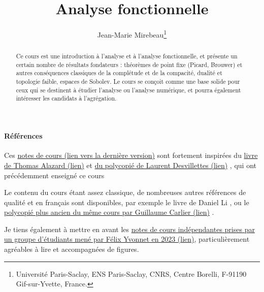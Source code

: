 \documentclass[11pt]{article}
\title{Analyse fonctionnelle}
\author{Jean-Marie Mirebeau\footnote{
Universit\'e Paris-Saclay, ENS Paris-Saclay, CNRS, Centre Borelli, F-91190 Gif-sur-Yvette, France.
}}
\begin{document}
\maketitle
\begin{abstract}
Ce cours est une introduction à l'analyse et à l'analyse fonctionnelle, et présente un certain nombre de résultats fondateurs : théorèmes de point fixe (Picard, Brouwer) et autres conséquences classiques de la complétude et de la compacité, dualité et topologie faible, espaces de Sobolev.
Le cours se conçoit comme une base solide pour ceux qui se destinent à étudier l'analyse ou l'analyse numérique, et pourra également intéresser les candidats à l'agrégation. 
\end{abstract}


\tableofcontents

\paragraph{Références}

Ces \href{https://www.dropbox.com/scl/fi/d3vfdgnaje0iwxyfyejqw/M1_Analyse_Shared.pdf?rlkey=qfngap7sa3uh1xo5ukxt8ddpi&dl=0}{notes de cours (lien vers la dernière version)} sont fortement inspirées du 
\href{http://talazard.perso.math.cnrs.fr/Livre.pdf}{livre de Thomas Alazard (lien)} 
\cite{alazard2017analyse} et 
\href{https://www.dropbox.com/scl/fi/t7tj1pm7pxcc5t67gyizj/Desvillettes_2015_AF.pdf?rlkey=8k1gvfgcmiczqqjxxvwblnugn&dl=1}{du polycopié de Laurent Desvillettes (lien)} 
\cite{desvilettes2015analyse}, qui ont précédemment enseigné ce cours

Le contenu du cours étant assez classique, de nombreuses autres références de qualité et en français sont disponibles, par exemple le livre de Daniel Li \cite{li2013cours}, ou le 
\href{https://www.ceremade.dauphine.fr/~carlier/poly2010.pdf}{polycopié plus ancien du même cours par Guillaume Carlier (lien)} \cite{carlier2009analyse}.

Je tiens également à mettre en avant les 
\href{https://www.dropbox.com/scl/fi/3gir3uhkt842idl9sfyc3/main_Shared.pdf?rlkey=xruzgtc6kzfedhjx0uecku0yq&dl=0}{notes de cours indépendantes prises par un groupe d'étudiants mené par Félix Yvonnet en 2023 (lien)}, particulièrement agréables à lire et accompagnées de figures. 
\end{document}
